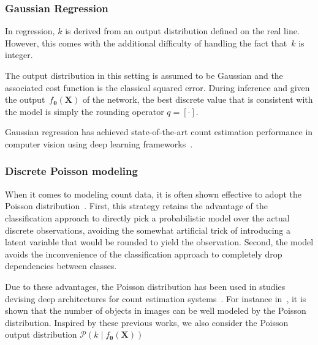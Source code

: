 \subsubsection{Gaussian Regression}
In regression, $k$ is derived from an output distribution defined on the real line.
However, this comes with the additional difficulty of handling the fact that~$k$ is integer.

The output distribution in this setting is assumed to be Gaussian and the associated cost function is the classical squared error.
During inference and given the output~$f_{\mathbf{\boldsymbol{\theta}}}\left(\mathbf{X}\right)$ of the network, the best discrete value that is consistent with the model is simply the rounding operator $q = \left[\cdot\right]$.

Gaussian regression has achieved state-of-the-art count estimation performance in computer vision using deep learning frameworks~\cite{zhang15, marsden16, boominathan16}.

\subsubsection{Discrete Poisson modeling}
When it comes to modeling count data, it is often shown effective to adopt the Poisson distribution~\cite{fallah09}.
First, this strategy retains the advantage of the classification approach to directly pick a probabilistic model over the actual discrete observations, avoiding the somewhat artificial trick of introducing a latent variable that would be rounded to yield the observation.
Second, the model avoids the inconvenience of the classification approach to completely drop dependencies between classes.

Due to these advantages, the Poisson distribution has been used in studies devising deep architectures for count estimation systems~\cite{Rezatofigh16}.
For instance in~\cite{fallah09, chan09, Rezatofigh16}, it is shown that the number of objects in images can be well modeled by the Poisson distribution. Inspired by these previous works, we also consider the Poisson output distribution \(\mathcal{P}\left(k\mid f_{\mathbf{\boldsymbol{\theta}}}\left(\mathbf{X}\right)\right)\)

